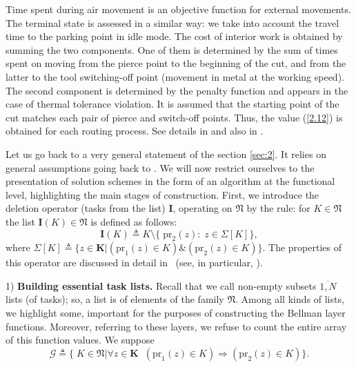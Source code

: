 Time spent during air movement
is an
objective function for external movements.
The terminal state is assessed in a similar way:
we take into account the travel time to the parking point
in idle mode.
The cost of interior work
is obtained by summing the two components.
One of them is determined by the sum of times
spent on moving
from the pierce point to the beginning of the cut,
and from the latter to the tool switching-off point
(movement in metal at the working speed).
The second component is determined by the penalty function and
appears in the case of thermal tolerance violation.
It is assumed that the starting point of the cut
matches each pair
of pierce and switch-off points.
Thus,
the value (\ref{2.12})
is obtained
for each routing process.
See details in
\cite[part 1, chapter 3]{4}
and also in
\cite{18}.


Let us go back to a very general statement of the section
\ref{sec:2}.
It relies on general assumptions going back to
\cite[$\S$4.9]{14}.
We will now restrict ourselves to the presentation of
solution schemes
in the form of an algorithm at the functional level,
highlighting the main stages of construction.
First,
we introduce the deletion operator
(tasks from the list)
$\mathbf{I}$,
operating on $\mathfrak{N}$
by the rule:
for
$K \in \mathfrak{N}$
the list
$\mathbf{I}(K) \in \mathfrak{N}$
is defined as follows:
\begin{equation}\label{4.1}
  \mathbf{I}(K) {\triangleq} K \setminus \{\;\mathrm{pr}_2(z):\;z \in \Sigma[K]\},
\end{equation}
where
$\Sigma[K] {\triangleq} \{z \in \mathbf{K} \vert (\mathrm{pr}_1(z) \in K) \& (\mathrm{pr}_2(z) \in K)\}.$
The properties of this operator are discussed in detail in~\cite[part 2]{14}
(see, in particular, \cite[$\S 2.2$]{14}).

1) {\bf Building essential task lists.}
Recall
that we call
non-empty subsets
$ \overline {1, N} $
lists
(of tasks);
so,
a list is of elements of the family
$\mathfrak{N}$.
Among all kinds of lists,
we highlight some,
important for the purposes of constructing the Bellman layer functions.
Moreover,
referring to these layers,
we refuse to count the entire array of
this function values.
We suppose
\begin{equation}\label{4.2}
  \mathcal{G} {\triangleq} \{\;K \in \mathfrak{N} \vert
  \forall{z} \in \mathbf{K}\;\;(\mathrm{pr}_1(z) \in K) \Longrightarrow (\mathrm{pr}_2(z) \in K)\}.
\end{equation}

